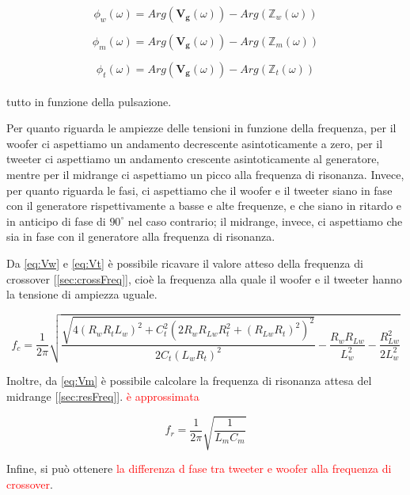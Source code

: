 \documentclass[12pt,italian]{article}
\newcommand{\err}[1]{\textcolor{red}{#1}}
\begin{document}
\begin{equation}
	\phi_{w}(\omega) = Arg(\mathbf{V_{g}}(\omega)) - Arg(\mathbb{Z}_{w}(\omega))
\end{equation}

\begin{equation}
	\phi_{m}(\omega) = Arg(\mathbf{V_{g}}(\omega)) - Arg(\mathbb{Z}_{m}(\omega))
\end{equation}

\begin{equation}
	\phi_{t}(\omega) =  Arg(\mathbf{V_{g}}(\omega)) - Arg(\mathbb{Z}_{t}(\omega))
\end{equation}
\\
tutto in funzione della pulsazione.

Per quanto riguarda le ampiezze delle tensioni in funzione della frequenza, per
il woofer ci aspettiamo un andamento decrescente asintoticamente a zero, per il
tweeter ci aspettiamo un andamento crescente asintoticamente al generatore,
mentre per il midrange ci aspettiamo un picco alla frequenza di risonanza.
Invece, per quanto riguarda le fasi, ci aspettiamo che il woofer e il tweeter
siano in fase con il generatore rispettivamente a basse e alte frequenze, e che
siano in ritardo e in anticipo di fase di $90^\circ$ nel caso contrario; il
midrange, invece, ci aspettiamo che sia in fase con il generatore alla
frequenza di risonanza.

Da \eqref{eq:Vw} e \eqref{eq:Vt} è possibile ricavare il valore atteso della
frequenza di crossover [\ref{sec:crossFreq}], cioè la frequenza alla quale il
woofer e il tweeter hanno la tensione di ampiezza uguale.

\begin{equation}
	f_{c} = \frac{1}{2\pi}\sqrt{\frac{\sqrt{4 (R_{w} R_{t} L_{w})^2 + C_{t}^2(2
				R_{w} R_{Lw} R_{t}^2 + (R_{Lw} R_{t})^2)^2}}{2 C _{t} (L_{w} R_{t})^2 } -
		\frac{R_{w} R_{Lw}}{L_{w}^2} - \frac{R_{Lw}^2}{2 L_{w}^2}}
	\label{eq:fc}
\end{equation}

\noindent
Inoltre, da \eqref{eq:Vm} è possibile calcolare la frequenza di risonanza attesa del midrange [\ref{sec:resFreq}].
\err{è approssimata}

\begin{equation}
	f_{r} = \frac{1}{2\pi}\sqrt{\frac{1}{L_{m} C_{m}}}  %
	\label{eq:fr}
\end{equation}

\noindent
Infine, si può ottenere \err{la differenza d fase tra tweeter e woofer alla frequenza di crossover}.
\end{document}

